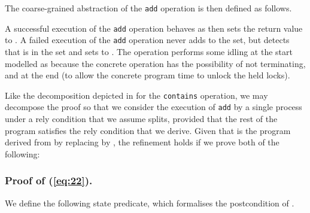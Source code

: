 \documentclass{article}
\theoremstyle{plain}
\theoremstyle{definition}
\begin{document}
The coarse-grained abstraction of the \texttt{add} operation is then
defined as follows.

A successful execution of the \texttt{add} operation behaves as
 then sets the return value  to . A failed
execution of the \texttt{add} operation never adds  to the set,
but detects that  is in the set and sets  to . The
 operation performs some idling at the start modelled as
 because the concrete operation has the possibility of
not terminating, and at the end (to allow the concrete program time to
unlock the held locks).

Like the decomposition depicted in  for the
\texttt{contains} operation, we may decompose the proof so that we
consider the execution of \texttt{add} by a single process under a
rely condition  that we assume splits, provided that the rest of
the program satisfies the rely condition that we derive. Given that
 is the program derived from  by
replacing  by , the refinement holds if
we prove both of the following:


\subsubsection{Proof of (\ref{eq:22}).}

We define the following state predicate, which formalises the
postcondition of .
\end{document}
